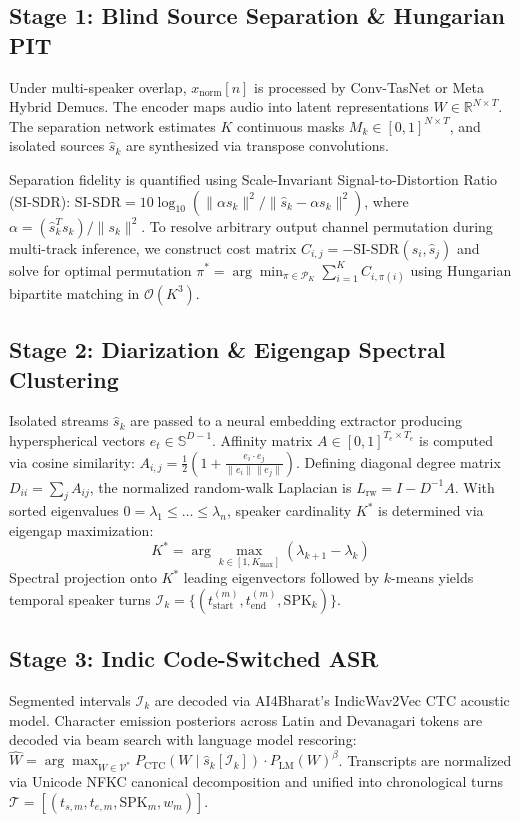 \documentclass[12pt,a4paper,twocolumn]{article}
\begin{document}
\subsection{Stage 1: Blind Source Separation \& Hungarian PIT}
Under multi-speaker overlap, $x_{\text{norm}}[n]$ is processed by Conv-TasNet or Meta Hybrid Demucs. The encoder maps audio into latent representations $W \in \mathbb{R}^{N \times T}$. The separation network estimates $K$ continuous masks $M_k \in [0, 1]^{N \times T}$, and isolated sources $\hat{s}_k$ are synthesized via transpose convolutions.

Separation fidelity is quantified using Scale-Invariant Signal-to-Distortion Ratio (SI-SDR):
$\text{SI-SDR} = 10 \log_{10} (\|\alpha s_k\|^2 / \|\hat{s}_k - \alpha s_k\|^2)$, where $\alpha = (\hat{s}_k^T s_k)/\|s_k\|^2$.
To resolve arbitrary output channel permutation during multi-track inference, we construct cost matrix $C_{i,j} = -\text{SI-SDR}(s_i, \hat{s}_j)$ and solve for optimal permutation $\pi^* = \arg\min_{\pi \in \mathcal{P}_K} \sum_{i=1}^K C_{i, \pi(i)}$ using Hungarian bipartite matching in $\mathcal{O}(K^3)$.

\subsection{Stage 2: Diarization \& Eigengap Spectral Clustering}
Isolated streams $\hat{s}_k$ are passed to a neural embedding extractor producing hyperspherical vectors $e_t \in \mathbb{S}^{D-1}$. Affinity matrix $A \in [0, 1]^{T_e \times T_e}$ is computed via cosine similarity: $A_{i,j} = \frac{1}{2}(1 + \frac{e_i \cdot e_j}{\|e_i\| \|e_j\|})$. Defining diagonal degree matrix $D_{ii} = \sum_j A_{ij}$, the normalized random-walk Laplacian is $L_{\text{rw}} = I - D^{-1} A$. With sorted eigenvalues $0 = \lambda_1 \le \dots \le \lambda_n$, speaker cardinality $K^*$ is determined via eigengap maximization:
\begin{equation}
  K^* = \arg\max_{k \in [1, K_{\max}]} (\lambda_{k+1} - \lambda_k)
\end{equation}
Spectral projection onto $K^*$ leading eigenvectors followed by $k$-means yields temporal speaker turns $\mathcal{I}_k = \{(t_{\text{start}}^{(m)}, t_{\text{end}}^{(m)}, \text{SPK}_k)\}$.

\subsection{Stage 3: Indic Code-Switched ASR}
Segmented intervals $\mathcal{I}_k$ are decoded via AI4Bharat's IndicWav2Vec CTC acoustic model. Character emission posteriors across Latin and Devanagari tokens are decoded via beam search with language model rescoring: $\hat{W} = \arg\max_{W \in \mathcal{V}^*} P_{\text{CTC}}(W \mid \hat{s}_k[\mathcal{I}_k]) \cdot P_{\text{LM}}(W)^\beta$. Transcripts are normalized via Unicode NFKC canonical decomposition and unified into chronological turns $\mathcal{T} = [(t_{s,m}, t_{e,m}, \text{SPK}_m, w_m)]$.
\end{document}
